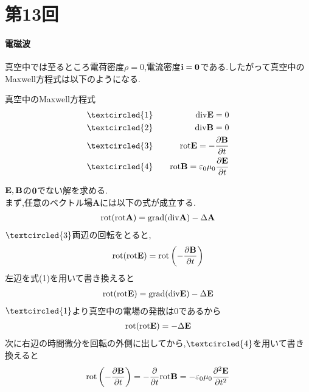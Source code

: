 \documentclass[../main]{subfiles}
\begin{document}
\clearpage

\setcounter{eqnarray}{0}
\setcounter{equation}{0}
\setcounter{figure}{0}

\part*{第13回}

\subsection{電磁波}
真空中では至るところ電荷密度$\rho=0$,電流密度${\bf i}={\bf 0}$である.したがって真空中のMaxwell方程式は以下のようになる. \\
\begin{itembox}[c]{真空中のMaxwell方程式}
\begin{eqnarray*}
&\textcircled{\scriptsize 1}& \quad {\rm div}{\bf E}=0 \\
&\textcircled{\scriptsize 2}& \quad {\rm div}{\bf B}=0 \\
&\textcircled{\scriptsize 3}& \quad {\rm rot}{\bf E}=-\frac{\partial {\bf B}}{\partial t} \\
&\textcircled{\scriptsize 4}& \quad {\rm rot}{\bf B}= \varepsilon_0 \mu_0   \frac{\partial {\bf E}}{\partial t}
\end{eqnarray*}
\end{itembox}
${\bf E},{\bf B}$の${\bf 0}$でない解を求める. \\
まず,任意のベクトル場{\bf A}には以下の式が成立する.
\begin{eqnarray}
{\rm rot}({\rm rot}{\bf A}) = {\rm grad}({\rm div}{\bf A}) - \Delta {\bf A}
\end{eqnarray}
$\textcircled{\scriptsize 3}$両辺の回転をとると,
\begin{eqnarray*}
{\rm rot}({\rm rot}{\bf E}) = {\rm rot} \left( -\frac{\partial {\bf B}}{\partial t} \right)
\end{eqnarray*}
左辺を式(1)を用いて書き換えると
\begin{eqnarray*}
{\rm rot}({\rm rot}{\bf E}) = {\rm grad}({\rm div}{\bf E}) - \Delta {\bf E}
\end{eqnarray*}
$\textcircled{\scriptsize 1}$より真空中の電場の発散は0であるから
\begin{eqnarray*}
{\rm rot}({\rm rot}{\bf E}) = - \Delta {\bf E}
\end{eqnarray*}
次に右辺の時間微分を回転の外側に出してから,$\textcircled{\scriptsize 4}$を用いて書き換えると
\begin{eqnarray*}
{\rm rot} \left( -\frac{\partial {\bf B}}{\partial t} \right) = -\frac{\partial}{\partial t} {\rm rot}{\bf B} = - \varepsilon_0 \mu_0 \frac{\partial^2 {\bf E}}{\partial t^2}
\end{eqnarray*}
\end{document}
